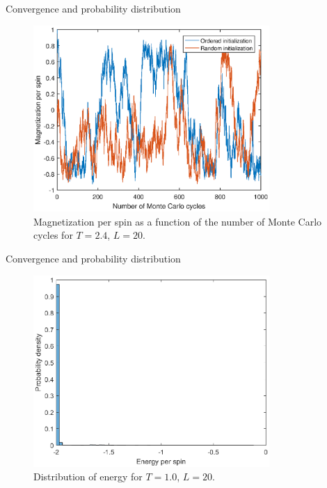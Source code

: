 \documentclass{beamer}
\begin{document}
\begin{frame}{Convergence and probability distribution}
\begin{figure}
\includegraphics[width=0.8\textwidth]{Process_mag_highT.eps}
\caption{Magnetization per spin as a function of the number of Monte Carlo cycles for $T=2.4$, $L=20$. }
\end{figure}
\end{frame}

\begin{frame}{Convergence and probability distribution}
\begin{figure}
	\includegraphics[width=0.8\textwidth]{Prob_ene_lowT.eps}
	\caption{Distribution of energy for $T=1.0$, $L=20$. }
\end{figure}
\end{frame}
\end{document}
